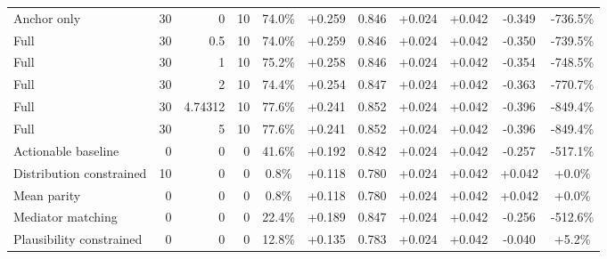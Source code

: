\begin{table}[htbp]
\begin{tabular}{lrrrccccccc}
Anchor only & 30 & 0 & 10 & 74.0\% & +0.259 & 0.846 & +0.024 & +0.042 & -0.349 & -736.5\% \\
Full & 30 & 0.5 & 10 & 74.0\% & +0.259 & 0.846 & +0.024 & +0.042 & -0.350 & -739.5\% \\
Full & 30 & 1 & 10 & 75.2\% & +0.258 & 0.846 & +0.024 & +0.042 & -0.354 & -748.5\% \\
Full & 30 & 2 & 10 & 74.4\% & +0.254 & 0.847 & +0.024 & +0.042 & -0.363 & -770.7\% \\
Full & 30 & 4.74312 & 10 & 77.6\% & +0.241 & 0.852 & +0.024 & +0.042 & -0.396 & -849.4\% \\
Full & 30 & 5 & 10 & 77.6\% & +0.241 & 0.852 & +0.024 & +0.042 & -0.396 & -849.4\% \\
Actionable baseline & 0 & 0 & 0 & 41.6\% & +0.192 & 0.842 & +0.024 & +0.042 & -0.257 & -517.1\% \\
Distribution constrained & 10 & 0 & 0 & 0.8\% & +0.118 & 0.780 & +0.024 & +0.042 & +0.042 & +0.0\% \\
Mean parity & 0 & 0 & 0 & 0.8\% & +0.118 & 0.780 & +0.024 & +0.042 & +0.042 & +0.0\% \\
Mediator matching & 0 & 0 & 0 & 22.4\% & +0.189 & 0.847 & +0.024 & +0.042 & -0.256 & -512.6\% \\
Plausibility constrained & 0 & 0 & 0 & 12.8\% & +0.135 & 0.783 & +0.024 & +0.042 & -0.040 & +5.2\% \\
\bottomrule
\end{tabular}
\end{table}